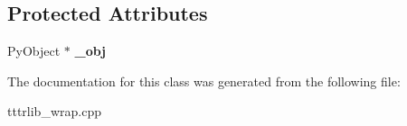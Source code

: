 \subsection*{Protected Attributes}
\begin{DoxyCompactItemize}
\item 
\mbox{\label{classswig_1_1_swig_ptr___py_object_ae617c5726496db423cd19688e3264618}} 
Py\+Object $\ast$ {\bfseries \+\_\+obj}
\end{DoxyCompactItemize}


The documentation for this class was generated from the following file\+:\begin{DoxyCompactItemize}
\item 
tttrlib\+\_\+wrap.\+cpp\end{DoxyCompactItemize}
